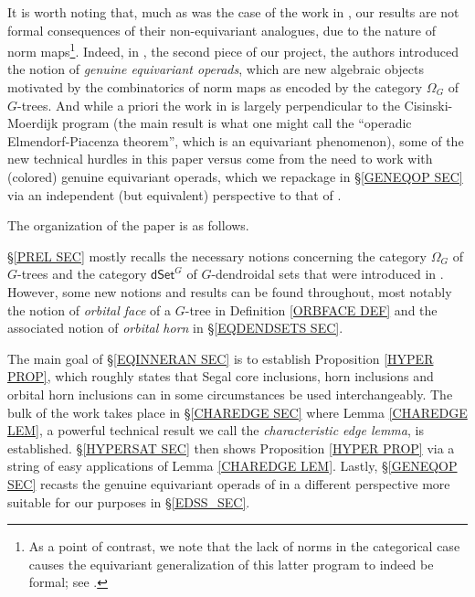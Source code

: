\documentclass[a4paper,10pt
 ,draft
]{article}%
\begin{document}
It is worth noting that, much as was the case of the work in \cite{Per18}, our results are not formal consequences of their non-equivariant analogues, due to the nature of norm maps\footnote{As a point of contrast, we note that the lack of norms in the categorical case causes the equivariant generalization of this latter program to indeed be formal; see \cite{Ste16,Ber17}.}.
Indeed, in \cite{BP17}, the second piece of our project,
the authors introduced the notion of 
\textit{genuine equivariant operads},
which are new algebraic objects motivated by the combinatorics of norm maps as encoded by the category $\Omega_G$ of $G$-trees.
And while a priori the work in \cite{BP17} is largely perpendicular to the Cisinski-Moerdijk program
(the main result \cite[Thm. III]{BP17} is what one might call the 
``operadic Elmendorf-Piacenza theorem'', which is an equivariant phenomenon),
some of the new technical hurdles in this paper versus \cite{CM13a} come from the need to work with 
(colored) genuine equivariant operads, 
which we repackage in \S \ref{GENEQOP SEC} via an independent (but equivalent) perspective to that of \cite{BP17}.












\vskip 10pt

The organization of the paper is as follows.

\S \ref{PREL SEC} mostly recalls the necessary notions concerning the category $\Omega_G$ of $G$-trees and the category $\mathsf{dSet}^G$ of $G$-dendroidal sets 
that were introduced in \cite{Per18}.
However, some new notions and results can be found throughout, most notably the notion of \textit{orbital face} of a $G$-tree in Definition \ref{ORBFACE DEF}
and the associated notion of \textit{orbital horn} in 
\S \ref{EQDENDSETS SEC}.

The main goal of \S \ref{EQINNERAN SEC} is to establish
Proposition \ref{HYPER PROP},
which roughly states that Segal core inclusions, horn inclusions and orbital horn inclusions can in some circumstances be used interchangeably.
The bulk of the work takes place in 
\S \ref{CHAREDGE SEC} where Lemma \ref{CHAREDGE LEM},
a powerful technical result we call the
\textit{characteristic edge lemma}, is established.
\S \ref{HYPERSAT SEC} then shows Proposition \ref{HYPER PROP} via a string of easy applications of 
Lemma \ref{CHAREDGE LEM}.
Lastly, \S \ref{GENEQOP SEC} recasts the genuine equivariant operads of \cite{BP17} in a different perspective more suitable for our purposes in \S \ref{EDSS_SEC}.
\end{document}
